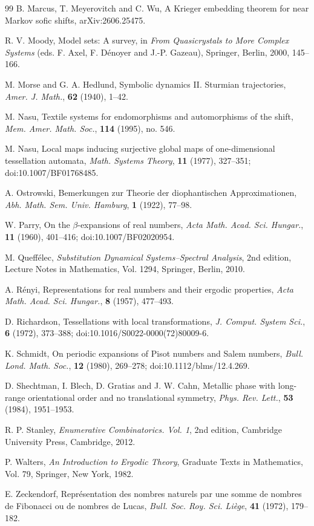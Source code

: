 \begin{thebibliography}{99}
B. Marcus, T. Meyerovitch and C. Wu,
A Krieger embedding theorem for near Markov sofic shifts,
arXiv:2606.25475.

R. V. Moody, Model sets: A survey, in \textit{From Quasicrystals to More Complex Systems} (eds. F. Axel, F. D\'enoyer and J.-P. Gazeau), Springer, Berlin, 2000, 145--166.

M. Morse and G. A. Hedlund, Symbolic dynamics II. Sturmian trajectories, \textit{Amer. J. Math.}, \textbf{62} (1940), 1--42.

M. Nasu, Textile systems for endomorphisms and automorphisms of the shift, \textit{Mem. Amer. Math. Soc.}, \textbf{114} (1995), no. 546.

M. Nasu, Local maps inducing surjective global maps of one-dimensional
tessellation automata,
\textit{Math. Systems Theory}, \textbf{11} (1977), 327--351;
doi:10.1007/BF01768485.

A. Ostrowski, Bemerkungen zur Theorie der diophantischen Approximationen, \textit{Abh. Math. Sem. Univ. Hamburg}, \textbf{1} (1922), 77--98.

W. Parry, On the $\beta$-expansions of real numbers, \textit{Acta Math. Acad. Sci. Hungar.}, \textbf{11} (1960), 401--416; doi:10.1007/BF02020954.

M. Queff\'elec, \textit{Substitution Dynamical Systems--Spectral Analysis}, 2nd edition, Lecture Notes in Mathematics, Vol. 1294, Springer, Berlin, 2010.

A. R\'enyi, Representations for real numbers and their ergodic properties,
\textit{Acta Math. Acad. Sci. Hungar.}, \textbf{8} (1957), 477--493.

D. Richardson, Tessellations with local transformations,
\textit{J. Comput. System Sci.}, \textbf{6} (1972), 373--388;
doi:10.1016/S0022-0000(72)80009-6.

K. Schmidt, On periodic expansions of Pisot numbers and Salem numbers,
\textit{Bull. Lond. Math. Soc.}, \textbf{12} (1980), 269--278;
doi:10.1112/blms/12.4.269.

D. Shechtman, I. Blech, D. Gratias and J. W. Cahn, Metallic phase with long-range orientational order and no translational symmetry, \textit{Phys. Rev. Lett.}, \textbf{53} (1984), 1951--1953.

R. P. Stanley, \textit{Enumerative Combinatorics. Vol. 1}, 2nd edition, Cambridge University Press, Cambridge, 2012.

P. Walters, \textit{An Introduction to Ergodic Theory}, Graduate Texts in Mathematics, Vol. 79, Springer, New York, 1982.

E. Zeckendorf, Repr\'esentation des nombres naturels par une somme de nombres de Fibonacci ou de nombres de Lucas, \textit{Bull. Soc. Roy. Sci. Li\`ege}, \textbf{41} (1972), 179--182.

\end{thebibliography}
